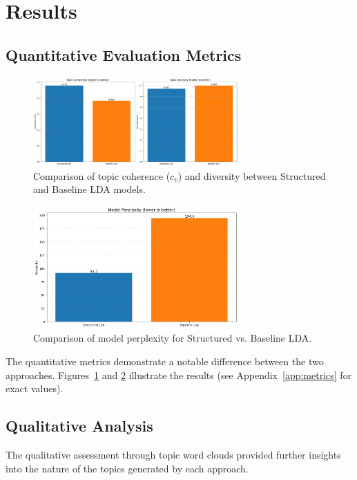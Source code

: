 \documentclass{article}
\begin{document}
\section{Results}
\subsection{Quantitative Evaluation Metrics}

\begin{figure}[ht]
    \centering
    \includegraphics[width=0.7\textwidth]{plots/coherence_and_diversity_plots.png}
    \caption{Comparison of topic coherence ($c_v$) and diversity between Structured and Baseline LDA models.}
    \label{fig:coherence-diversity}
\end{figure}

\begin{figure}[ht]
    \centering
    \includegraphics[width=0.7\textwidth]{plots/perplexity_plot.png}
    \caption{Comparison of model perplexity for Structured vs. Baseline LDA.}
    \label{fig:perplexity}
\end{figure}

The quantitative metrics demonstrate a notable difference between the two approaches. Figures~\ref{fig:coherence-diversity} and \ref{fig:perplexity} illustrate the results (see Appendix~\ref{app:metrics} for exact values).

\subsection{Qualitative Analysis}
The qualitative assessment through topic word clouds provided further insights into the nature of the topics generated by each approach.
\end{document}
